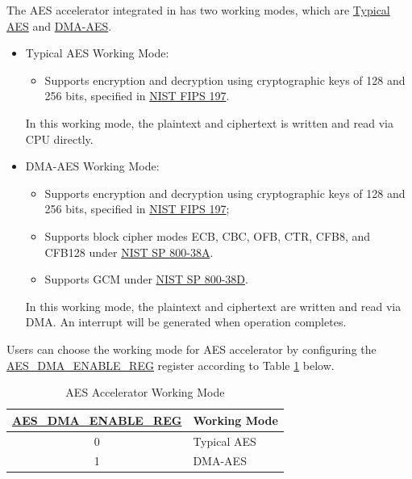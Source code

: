 \documentclass[main\_\_EN.tex]{subfiles}
\begin{document}
The AES accelerator integrated in \chipname{} has two working modes, which are \hyperref[sec:aes-typical-modes]{Typical AES} and \hyperref[sec:aes-dma-aes]{DMA-AES}.

\begin{itemize}
    \item Typical AES Working Mode: \begin{itemize}
        \item Supports encryption and decryption using cryptographic keys of 128 and 256 bits, specified in \href{https://nvlpubs.nist.gov/nistpubs/FIPS/NIST.FIPS.197.pdf}{NIST FIPS 197}.
    \end{itemize}
    In this working mode, the plaintext and ciphertext is written and read via CPU directly.
    \item DMA-AES Working Mode:
    \begin{itemize}
        \item Supports encryption and decryption using cryptographic keys of 128 and 256 bits, specified in \href{https://nvlpubs.nist.gov/nistpubs/FIPS/NIST.FIPS.197.pdf}{NIST FIPS 197};
        \item Supports block cipher modes ECB, CBC, OFB, CTR, CFB8, and CFB128 under \href{https://nvlpubs.nist.gov/nistpubs/Legacy/SP/nistspecialpublication800-38a.pdf}{NIST SP 800-38A}.
        \item Supports GCM under \href{https://nvlpubs.nist.gov/nistpubs/Legacy/SP/nistspecialpublication800-38d.pdf}{NIST SP 800-38D}.
    \end{itemize}
    In this working mode, the plaintext and ciphertext are written and read via DMA. An interrupt will be generated when operation completes.
\end{itemize}

Users can choose the working mode for AES accelerator by configuring the \hyperref[regdesc:AESDMAENABLEREG]{AES\_DMA\_ENABLE\_REG} register according to Table \ref{tab:aes-dma-enable} below.

\begin{longtable}[c]{ | c | l | }
\caption{AES Accelerator Working Mode}
    \label{tab:aes-dma-enable}
    \\\hline
    \rowcolor{lightgray}
\textbf{\hyperref[regdesc:AESDMAENABLEREG]{AES\_DMA\_ENABLE\_REG}}      & \textbf{Working Mode}\\
        \hline
        0                       & Typical AES    \\
        \hline
        1                       & DMA-AES        \\
        \hline
\end{longtable}
\end{document}
